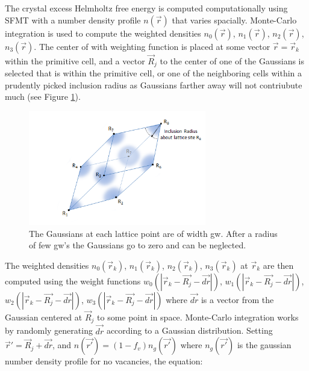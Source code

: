 \documentclass[double,12pt]{beavtex}
\begin{document}
The crystal excess Helmholtz free energy is computed computationally 
using SFMT with a number density profile $n(\vec r)$ that varies spacially.
Monte-Carlo integration is used to compute the weighted densities 
$n_0(\vec{r})$, $n_1(\vec{r})$, $n_2(\vec{r})$, $n_3(\vec{r})$.
%
The center of with weighting function is placed at some vector $\vec{r}=\vec{r}_k$ 
within the primitive cell, and a vector $\vec{R}_j$ to the center of one of 
the Gaussians is selected that is within the primitive cell, or one of the 
neighboring cells within a prudently picked inclusion radius as Gaussians 
farther away will not contriubute much (see Figure \ref{fig:InclusionRadius}).

 \begin{figure}[h!]
    \centering
    \includegraphics[height=5cm]{InclusionRadius.png}
    \caption{The Gaussians at each lattice point are of width gw. 
    After a radius of few gw's the Gaussians go to zero and can be neglected.}
    \label{fig:InclusionRadius}
  \end{figure} 

The weighted densities $n_0(\vec{r}_k)$, $n_1(\vec{r}_k)$, $n_2(\vec{r}_k)$, 
$n_3(\vec{r}_k)$ at $\vec{r}_k$ are then computed using the weight functions 
$w_0(|\vec{r}_k-\vec{R_j}-\vec{dr}|)$, $w_1(|\vec{r}_k-\vec{R_j}-\vec{dr}|)$, 
$w_2(|\vec{r}_k-\vec{R_j}-\vec{dr}|)$, $w_3(|\vec{r}_k-\vec{R_j}-\vec{dr}|)$ 
where $\vec{dr}$ is a vector from the Gaussian centered at $\vec{R}_j$ to 
some point in space. Monte-Carlo integration works by randomly generating 
$\vec{dr}$ according to a Gaussian distribution. Setting $\vec{r}'=\vec{R}_j + 
\vec{dr}$, and $n(\vec{r'})=(1-f_v)n_g(\vec{r'})$ where $n_g(\vec{r'})$ 
is the gaussian number density profile for no vacancies, the equation:
\end{document}

